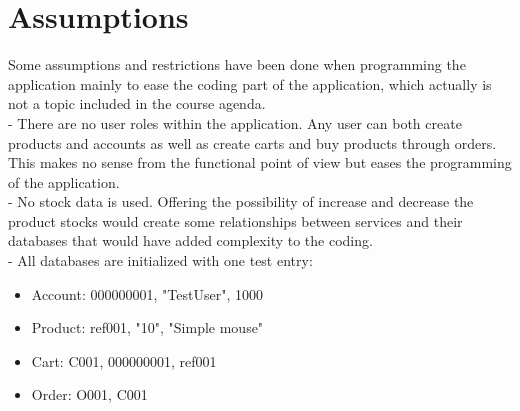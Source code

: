 \section{Assumptions}
Some assumptions and restrictions have been done when programming the application mainly to ease the coding part of the application, which actually is not a topic included in the course agenda.\\
 
- There are no user roles within the application. Any user can both create products and accounts as well as create carts and buy products through orders. This makes no sense from the functional point of view but eases the programming of the application.\\

- No stock data is used. Offering the possibility of increase and decrease the product stocks would create some relationships between services and their databases that would have added complexity to the coding.\\

- All databases are initialized with one test entry:

\begin{itemize}
\item Account: 000000001, "TestUser", 1000
\item Product: ref001, "10", "Simple mouse"
\item Cart: C001, 000000001, ref001
\item Order: O001, C001
\end{itemize}
